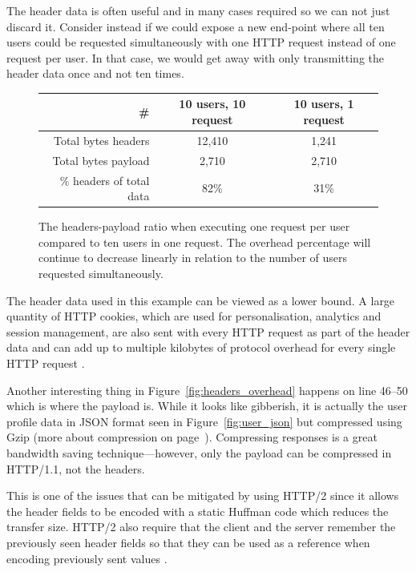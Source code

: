 \documentclass{cslthse-msc}
\begin{document}
The header data is often useful and in many cases required so we can not just discard it. Consider instead if we could expose a new end-point where all ten users could be requested simultaneously with one HTTP request instead of one request per user. In that case, we would get away with only transmitting the header data once and not ten times.

\begin{figure}[H]
  \centering
    \begin{center}
      \begin{tabular}{ r | c | c }
        \textbf{\#} & \textbf{10 users, 10 request} & \textbf{10 users, 1 request} \\ \hline
        Total bytes headers & 12,410 & 1,241 \\ \hline
        Total bytes payload & 2,710 & 2,710 \\ \hline
        \% headers of total data & 82\% & 31\% \\ \hline
      \end{tabular}
    \end{center}
  \caption{The headers-payload ratio when executing one request per user compared to ten users in one request. The overhead percentage will continue to decrease linearly in relation to the number of users requested simultaneously.}
\end{figure}

The header data used in this example can be viewed as a lower bound. A large quantity of HTTP cookies, which are used for personalisation, analytics and session management, are also sent with every HTTP request as part of the header data and can add up to multiple kilobytes of protocol overhead for every single HTTP request \cite[page 200]{HPBN}.

Another interesting thing in Figure~\ref{fig:headers_overhead} happens on line 46--50 which is where the payload is. While it looks like gibberish, it is actually the user profile data in JSON format seen in Figure~\ref{fig:user_json} but compressed using Gzip (more about compression on page~\pageref{compression_more}). Compressing responses is a great bandwidth saving technique---however, only the payload can be compressed in HTTP/1.1, not the headers.

This is one of the issues that can be mitigated by using HTTP/2 since it allows the header fields to be encoded with a static Huffman code which reduces the transfer size. HTTP/2 also require that the client and the server remember the previously seen header fields so that they can be used as a reference when encoding previously sent values \cite[page 19]{hpbn2}.
\end{document}
